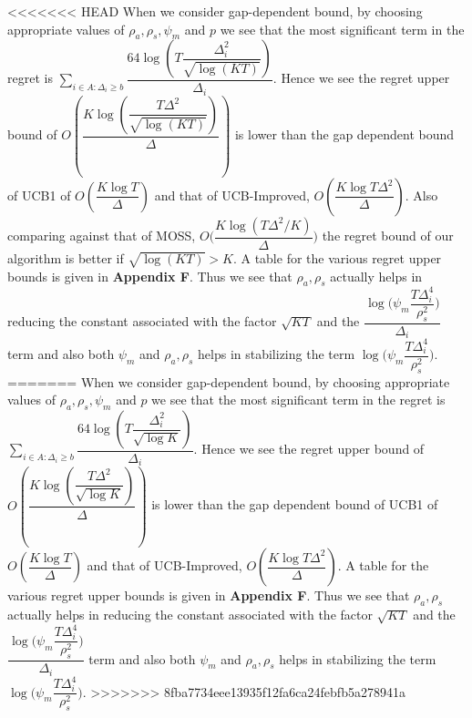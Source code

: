\begin{remark}
\label{Result:Rem:4}
<<<<<<< HEAD
	When we consider gap-dependent bound, by choosing appropriate values of $\rho_{a},\rho_{s},\psi_{m}$ and $p$ we see that the most significant term in the regret is $\sum_{i\in A:\Delta_{i}\geq b}\dfrac{64\log{(T\dfrac{\Delta_{i}^{2}}{\sqrt{\log (KT)}})}}{\Delta_{i}}$. Hence we see the regret upper bound of $O(\dfrac{K\log (\dfrac{T\Delta^{2}}{\sqrt{\log (KT)}})}{\Delta})$ is lower than the gap dependent bound of UCB1 of $O(\dfrac{K\log T}{\Delta})$ and that of UCB-Improved, $O(\dfrac{K\log T\Delta^{2}}{\Delta})$. Also comparing against that of MOSS, $O\bigg(\dfrac{K\log(T\Delta^{2}/K)}{\Delta}\bigg)$ the regret bound of our algorithm is better if $\sqrt{\log(KT)}>K$. A table for the various regret upper bounds is given in \textbf{Appendix F}. Thus we see that $\rho_{a},\rho_{s}$ actually helps in reducing the constant associated with the factor $\sqrt{KT}$ and the $\dfrac{\log\bigg(\psi_{m}\dfrac{T\Delta_{i}^{4}}{\rho_{s}^{2}}\bigg)}{\Delta_{i}}$ term and also both $\psi_{m}$ and $\rho_{a},\rho_{s}$ helps in stabilizing the term $\log\bigg(\psi_{m}\dfrac{T\Delta_{i}^{4}}{\rho_{s}^{2}}\bigg)$.
=======
	When we consider gap-dependent bound, by choosing appropriate values of $\rho_{a},\rho_{s},\psi_{m}$ and $p$ we see that the most significant term in the regret is $\sum_{i\in A:\Delta_{i}\geq b}\dfrac{64\log{(T\dfrac{\Delta_{i}^{2}}{\sqrt{\log K}})}}{\Delta_{i}}$. Hence we see the regret upper bound of $O(\dfrac{K\log (\dfrac{T\Delta^{2}}{\sqrt{\log K}})}{\Delta})$ is lower than the gap dependent bound of UCB1 of $O(\dfrac{K\log T}{\Delta})$ and that of UCB-Improved, $O(\dfrac{K\log T\Delta^{2}}{\Delta})$. A table for the various regret upper bounds is given in \textbf{Appendix F}. Thus we see that $\rho_{a},\rho_{s}$ actually helps in reducing the constant associated with the factor $\sqrt{KT}$ and the $\dfrac{\log\bigg(\psi_{m}\dfrac{T\Delta_{i}^{4}}{\rho_{s}^{2}}\bigg)}{\Delta_{i}}$ term and also both $\psi_{m}$ and $\rho_{a},\rho_{s}$ helps in stabilizing the term $\log\bigg(\psi_{m}\dfrac{T\Delta_{i}^{4}}{\rho_{s}^{2}}\bigg)$.
>>>>>>> 8fba7734eee13935f12fa6ca24febfb5a278941a
\end{remark}	



